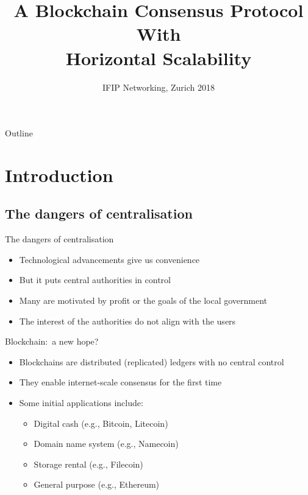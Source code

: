 \documentclass{beamer}
\title{A Blockchain Consensus Protocol With\\Horizontal Scalability}
\author[Short Name (U ABC)]{%
  \texorpdfstring{%
    \begin{columns}
      \column{.3333\linewidth}
      \centering
      Kelong~Cong \\ \small kelong.cong@epfl.ch \\ EPFL
      \column{.3333\linewidth}
      \centering
      Zhijie~Ren \\ \small z.ren@tudelft.nl \\ TU Delft
      \column{.3333\linewidth}
      \centering
      Johan~Pouwelse \\ \small peer2peer@gmail.com \\ TU Delft
    \end{columns}
 }
 {Kelong~Cong, Zhijie~Ren, Johan~Pouwelse}
}
\date{IFIP Networking, Zurich 2018}
\begin{document}
\begin{frame}
  \titlepage

\end{frame}

\begin{frame}{Outline}
  \tableofcontents[]
\end{frame}

\section{Introduction}
\subsection{The dangers of centralisation}
\begin{frame}{The dangers of centralisation}
  \begin{itemize}
    \item Technological advancements give us convenience
    \item But it puts central authorities in control
    \item Many are motivated by profit or the goals of the local government
    \item The interest of the authorities do not align with the users
  \end{itemize}
\end{frame}


\begin{frame}{Blockchain:~a new hope?}
  \begin{itemize}
    \item Blockchains are distributed (replicated) ledgers with no central control
    \item They enable internet-scale consensus for the first time
    \item Some initial applications include:
    \begin{itemize}
      \item Digital cash (e.g., Bitcoin, Litecoin)
      \item Domain name system (e.g., Namecoin)
      \item Storage rental (e.g., Filecoin)
      \item General purpose (e.g., Ethereum)
    \end{itemize}
  \end{itemize}
\end{frame}
\end{document}

